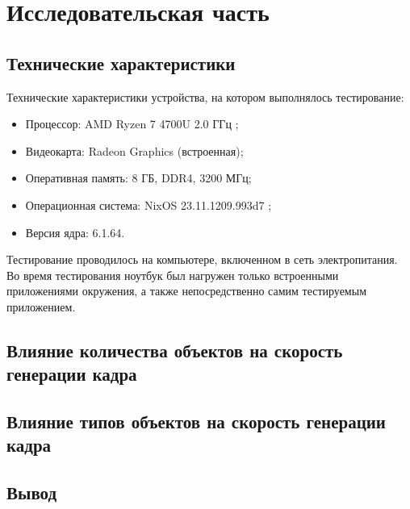 \section{Исследовательская часть}


\subsection{Технические характеристики}

Технические характеристики устройства, на котором выполнялось тестирование:
\begin{itemize}
    \item Процессор: AMD Ryzen 7 4700U 2.0 ГГц \cite{amd};
    \item Видеокарта: Radeon Graphics (встроенная);
    \item Оперативная память: 8 ГБ, DDR4, 3200 МГц;
    \item Операционная система: NixOS 23.11.1209.993d7 \cite{nixos};
    \item Версия ядра: 6.1.64.
\end{itemize}

Тестирование проводилось на компьютере, включенном в сеть электропитания.
Во время тестирования ноутбук был нагружен только встроенными приложениями окружения, а также непосредственно самим тестируемым приложением.

\subsection{Влияние количества объектов на скорость генерации кадра}


\subsection{Влияние типов объектов на скорость генерации кадра}


\subsection*{Вывод}

